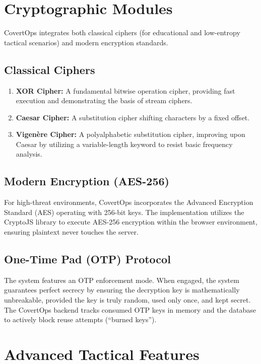 \documentclass[conference]{IEEEtran}
\begin{document}
\section{Cryptographic Modules}

CovertOps integrates both classical ciphers (for educational and low-entropy tactical scenarios) and modern encryption standards.

\subsection{Classical Ciphers}
\begin{enumerate}
    \item \textbf{XOR Cipher:} A fundamental bitwise operation cipher, providing fast execution and demonstrating the basis of stream ciphers.
    \item \textbf{Caesar Cipher:} A substitution cipher shifting characters by a fixed offset.
    \item \textbf{Vigenère Cipher:} A polyalphabetic substitution cipher, improving upon Caesar by utilizing a variable-length keyword to resist basic frequency analysis.
\end{enumerate}

\subsection{Modern Encryption (AES-256)}
For high-threat environments, CovertOps incorporates the Advanced Encryption Standard (AES) operating with 256-bit keys. The implementation utilizes the CryptoJS library to execute AES-256 encryption within the browser environment, ensuring plaintext never touches the server.

\subsection{One-Time Pad (OTP) Protocol}
The system features an OTP enforcement mode. When engaged, the system guarantees perfect secrecy by ensuring the decryption key is mathematically unbreakable, provided the key is truly random, used only once, and kept secret. The CovertOps backend tracks consumed OTP keys in memory and the database to actively block reuse attempts (``burned keys'').

\section{Advanced Tactical Features}
\end{document}
